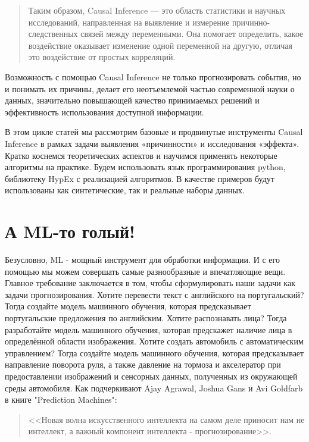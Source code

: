 \documentclass{article}
\begin{document}
        \begin{quote}
           Таким образом, Causal Inference — это область статистики и научных исследований, направленная на выявление и измерение причинно-следственных связей между переменными.
           Она помогает определить, какое воздействие оказывает изменение одной переменной на другую, отличая это воздействие от простых корреляций.
        \end{quote}

        Возможность с помощью Causal Inference не только прогнозировать события, но и понимать их причины, делает его неотъемлемой частью современной науки о данных, значительно повышающей качество принимаемых решений и эффективность использования доступной информации.

        В этом цикле статей мы рассмотрим базовые и продвинутые инструменты Causal Inference в рамках задачи выявления «причинности» и исследования «эффекта».
        Кратко коснемся теоретических аспектов и научимся применять некоторые алгоритмы на практике.
        Будем использовать язык программирования python, библиотеку HypEx с реализацией алгоритмов.
        В качестве примеров будут использованы как синтетические, так и реальные наборы данных.

    \section*{А ML-то голый!}
        Безусловно, ML - мощный инструмент для обработки информации.
        И с его помощью мы можем совершать самые разнообразные и впечатляющие вещи.
        Главное требование заключается в том, чтобы сформулировать наши задачи как задачи прогнозирования.
        Хотите перевести текст с английского на португальский?
        Тогда создайте модель машинного обучения, которая предсказывает португальские предложения по английским.
        Хотите распознавать лица?
        Тогда разработайте модель машинного обучения, которая предскажет наличие лица в определённой области изображения.
        Хотите создать автомобиль с автоматическим управлением?
        Тогда создайте модель машинного обучения, которая предсказывает направление поворота руля, а также давление на тормоза и акселератор при предоставлении изображений и сенсорных данных, полученных из окружающей среды автомобиля.
        Как подчеркивают Ajay Agrawal, Joshua Gans и Avi Goldfarb в книге "Prediction Machines":
        \begin{quote}
            <<Новая волна искусственного интеллекта на самом деле приносит нам не интеллект, а важный компонент интеллекта - прогнозирование>>.
        \end{quote}
\end{document}
